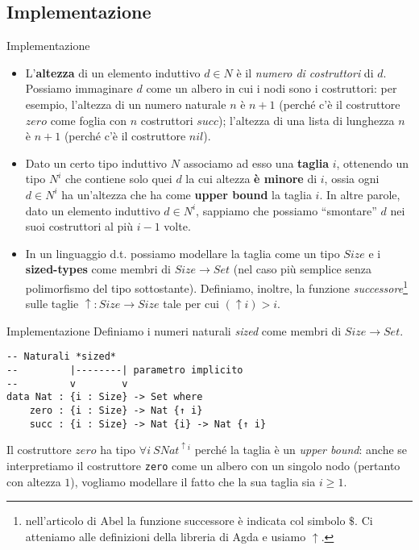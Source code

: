 \documentclass[t,aspectratio=169,9pt]{beamer}
\begin{document}
\subsection{Implementazione}
\begin{frame}{Implementazione}
	\begin{itemize}
		\item{
		L'{\bf altezza} di un elemento induttivo $d \in N$ è il
			{\it numero di costruttori} di $d$. Possiamo immaginare $d$ come
		un albero in cui i nodi sono i costruttori: per esempio,
		l'altezza di un numero naturale $n$ è $n+1$ (perché c'è il
		costruttore $zero$ come foglia con $n$ costruttori $succ$);
		l'altezza di una lista di lunghezza $n$ è $n+1$ (perché c'è
		il costruttore $nil$).
		}
		\item {
		      Dato un certo tipo induttivo $N$ associamo ad esso una {\bf
				      taglia} $i$, ottenendo un tipo $N^i$ che contiene solo quei
		      $d$ la cui altezza {\bf è minore} di $i$, ossia ogni $d \in
			      N^i$ ha un'altezza che ha come {\bf upper bound} la taglia
		      $i$. In altre parole, dato un elemento induttivo $d \in
			      N^{i}$, sappiamo che possiamo ``smontare'' $d$ nei suoi
		      costruttori al più $i-1$ volte. }
		\item  {
		      In un linguaggio d.t. possiamo modellare la taglia come un
		      tipo $Size$ e i {\bf sized-types} come membri di $Size
			      \rightarrow Set$ (nel caso più semplice senza polimorfismo
		      del tipo sottostante). Definiamo, inoltre, la funzione {\it
				      successore}\footnote{nell'articolo di Abel la funzione
			      successore è indicata col simbolo $\$$. Ci atteniamo alle
			      definizioni della libreria di Agda e usiamo $\uparrow$.} sulle
		      taglie $\uparrow : Size \rightarrow Size$ tale per cui
		      $(\uparrow i) > i$.
		      }
	\end{itemize}
\end{frame}
\begin{frame}[fragile]{Implementazione}
	Definiamo i numeri naturali {\it sized} come membri di $Size \rightarrow Set$.
	\begin{verbatim}
-- Naturali *sized*
--         |--------| parametro implicito
--         v        v
data Nat : {i : Size} -> Set where
    zero : {i : Size} -> Nat {↑ i} 
    succ : {i : Size} -> Nat {i} -> Nat {↑ i}
\end{verbatim}
	Il costruttore $zero$ ha tipo $\forall i ~ SNat^{\uparrow i}$ perché la taglia è
	un {\it upper bound}: anche se interpretiamo il costruttore \texttt{zero} come un albero
	con un singolo nodo (pertanto con altezza $1$), vogliamo modellare il fatto che
	la sua taglia sia $i \geq 1$.
\end{frame}
\end{document}
